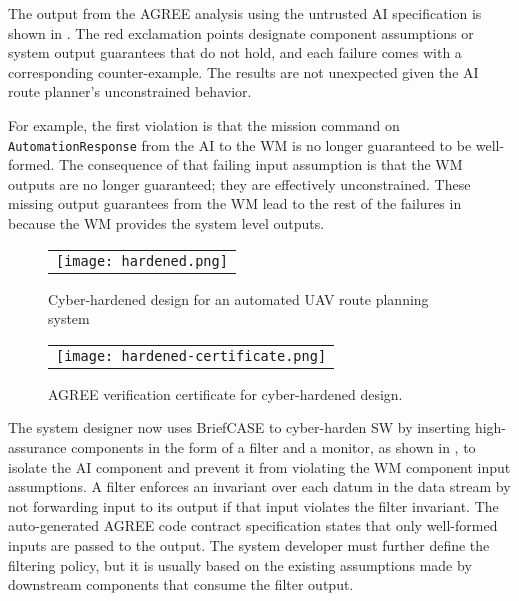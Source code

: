 The output from the AGREE analysis using the untrusted AI
specification is shown in .  The red
exclamation points designate component assumptions or system output
guarantees that do not hold, and each failure comes with a
corresponding counter-example.  The results are not unexpected given
the AI route planner's unconstrained behavior.

For example, the first violation is that the mission command on \texttt{AutomationResponse} from
the AI to the WM is no longer guaranteed to be well-formed.  The
consequence of that failing input assumption is that the WM outputs
are no longer guaranteed; they are effectively unconstrained.  These
missing output guarantees from the WM lead to the rest of the failures
in  because the WM provides the system
level outputs.

\begin{figure*}
  \begin{center}
    \begin{tabular}{c}
      \texttt{[image: hardened.png]}
    \end{tabular}
  \end{center}
  \caption{Cyber-hardened design for an automated UAV route planning system}
  \label{fig:hardened}
\end{figure*}

\begin{figure}
  \begin{center}
    \begin{tabular}{c}
      \texttt{[image: hardened-certificate.png]}
    \end{tabular}
  \end{center}
  \caption{AGREE verification certificate for cyber-hardened design.}
  \label{fig:hardened-certificate}
\end{figure}

The system designer now uses BriefCASE to cyber-harden SW by inserting
high-assurance components in the form of a filter and a monitor, as
shown in , to isolate the AI component and prevent it from violating the WM component input assumptions.
A filter enforces an invariant over
each datum in the data stream by not forwarding input to its output if
that input violates the filter invariant.  The auto-generated AGREE
code contract specification states that only well-formed inputs are passed to the
output.  The system developer must further define the filtering
policy, but it is usually based on the existing assumptions made by
downstream components that consume the filter output.

